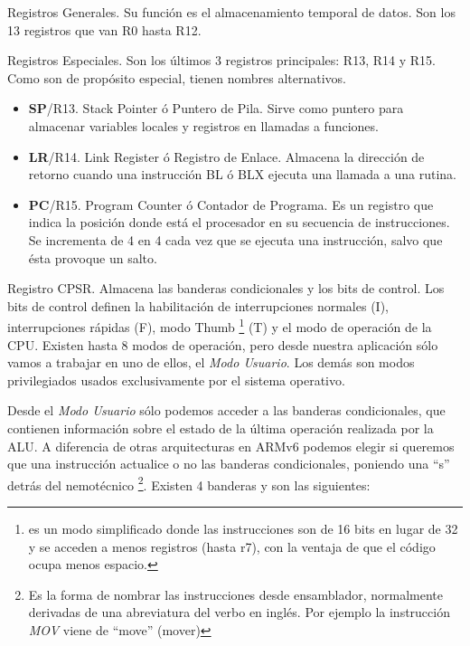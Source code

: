 \begin{descript}
  \item[Registros Generales.]
    Su función es el almacenamiento temporal de datos. Son los 13 registros
    que van R0 hasta R12.
  \item[Registros Especiales.]
    Son los últimos 3 registros principales: R13, R14 y R15. Como son de
    propósito especial, tienen nombres alternativos.

    \begin{itemize}
      \item{\textbf{SP}/R13. Stack Pointer ó Puntero de Pila. Sirve como puntero para almacenar
        variables locales y registros en llamadas a funciones.}
      \item{\textbf{LR}/R14. Link Register ó Registro de Enlace. Almacena la dirección de retorno
        cuando una instrucción BL ó BLX ejecuta una llamada a una rutina.}
      \item{\textbf{PC}/R15. Program Counter ó Contador de Programa. Es un registro que indica
        la posición donde está el procesador en su secuencia de instrucciones. Se
        incrementa de 4 en 4 cada vez que se ejecuta una instrucción, salvo que ésta
        provoque un salto.}
    \end{itemize}

  \item[Registro CPSR.]
        Almacena las banderas condicionales y los bits de control. Los bits de control
        definen la habilitación de interrupciones normales (I),
        interrupciones rápidas (F), modo Thumb \footnote{es un modo simplificado donde las
        instrucciones son de 16 bits en lugar de 32 y se acceden a menos registros (hasta r7),
        con la ventaja de que el código ocupa menos espacio.} (T) y el modo de operación
        de la CPU. Existen hasta 8 modos de operación, pero desde nuestra aplicación
        sólo vamos a trabajar en uno de ellos, el {\it Modo Usuario}. Los demás son modos
        privilegiados usados exclusivamente por el sistema operativo.

        Desde el {\it Modo Usuario} sólo podemos acceder a las banderas condicionales, que
        contienen información sobre el estado de la última operación realizada por la ALU.
        A diferencia de otras arquitecturas en ARMv6 podemos elegir si queremos que una
        instrucción actualice o no las banderas condicionales, poniendo una ``s'' detrás
        del nemotécnico \footnote{Es la forma de nombrar las instrucciones desde
        ensamblador, normalmente derivadas de una abreviatura del verbo en inglés. Por
        ejemplo la instrucción {\it MOV} viene de ``move'' (mover) }. Existen 4 banderas
        y son las siguientes:


\end{descript}
